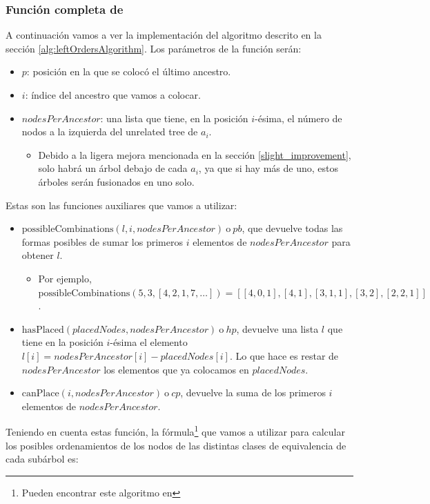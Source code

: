 \subsubsection{Función completa de \leftPossibleOrders} \label{subsubSection:leftOrdersImplementation}

A continuación vamos a ver la implementación del algoritmo descrito en la sección \ref{alg:leftOrdersAlgorithm}. Los parámetros de la función serán:
\begin{itemize}
    \item $p$: posición en la que se colocó el último ancestro.
    \item $i$: índice del ancestro que vamos a colocar.
    \item $nodesPerAncestor$: una lista que tiene, en la posición $i$-ésima, el número de nodos a la izquierda del unrelated tree de $a_i$.
        \begin{itemize}
            \item Debido a la ligera mejora mencionada en la sección \ref{slight_improvement}, solo habrá un árbol debajo de cada $a_i$, ya que si hay más de uno, estos árboles serán fusionados en uno solo. 
        \end{itemize}
\end{itemize}

Estas son las funciones auxiliares que vamos a utilizar:
\begin{itemize}
    \item $\mathrm{possibleCombinations}(l,i,nodesPerAncestor) \ \text{o} \ pb$, que devuelve todas las formas posibles de sumar los primeros $i$ elementos de $nodesPerAncestor$ para obtener $l$.
        \begin{itemize}
            \item Por ejemplo, $\mathrm{possibleCombinations}(5,3,[4,2,1,7,\dots])= [[4,0,1], [4,1], [3,1,1], [3,2], [2,2,1]]$.
        \end{itemize}
    \item $\mathrm{hasPlaced}(placedNodes, nodesPerAncestor) \ \text{o} \ hp$, devuelve una lista $l$ que tiene en la posición $i$-ésima el elemento $l[i]= nodesPerAncestor[i] - placedNodes[i]$. Lo que hace es restar de $nodesPerAncestor$ los elementos que ya colocamos en $placedNodes$.
    \item $\mathrm{canPlace}(i ,nodesPerAncestor) \ \text{o} \ cp$, devuelve la suma de los primeros $i$ elementos de $nodesPerAncestor$.
\end{itemize}
Teniendo en cuenta estas función, la fórmula\footnote{Pueden encontrar este algoritmo en } que vamos a utilizar para calcular los posibles ordenamientos de los nodos de las distintas clases de equivalencia de cada subárbol es:

